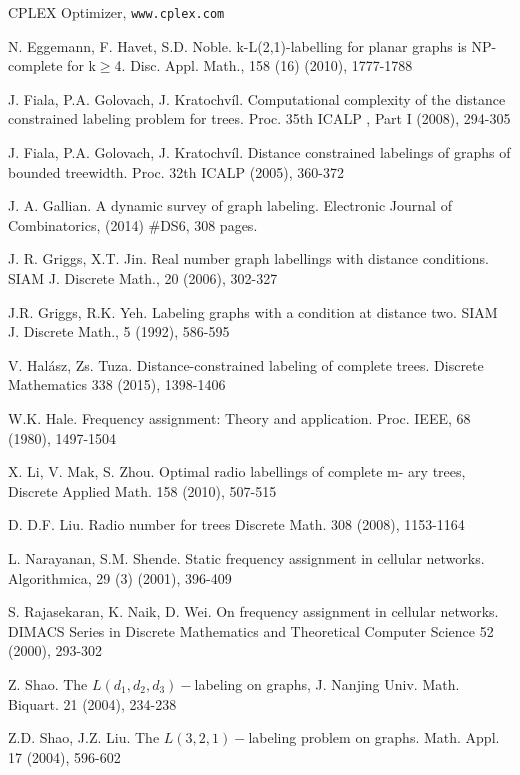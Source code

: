 \documentclass[smallextended]{svjour3}
\begin{document}
\begin{thebibliography}{1}
CPLEX Optimizer, \texttt{www.cplex.com}

N. Eggemann, F. Havet, S.D. Noble. k-L(2,1)-labelling 
for planar graphs is NP-complete for k$\geq$4. Disc. Appl. Math., 
158 (16) (2010), 1777-1788  

 J. Fiala, P.A. Golovach, J. Kratochv\'i­l. Computational 
complexity of the distance constrained labeling problem for trees. 
Proc. 35th ICALP , Part I (2008), 294-305 

J. Fiala, P.A. Golovach, J. Kratochv\'i­l. Distance 
constrained labelings of graphs of bounded treewidth. Proc. 32th ICALP (2005), 
360-372  

J. A. Gallian. A dynamic survey of graph labeling. Electronic Journal of Combinatorics, (2014) \#DS6, 308 pages. 

J. R. Griggs, X.T. Jin. Real number graph labellings with distance conditions. 
SIAM J. Discrete Math., 20 (2006), 302-327 

J.R. Griggs, R.K. Yeh. Labeling graphs with a condition 
at distance two. SIAM J. Discrete Math., 5 (1992), 586-595 

V. Hal\'asz, Zs. Tuza. Distance-constrained labeling of complete trees. Discrete Mathematics 338 (2015), 1398-1406

W.K. Hale. Frequency assignment: Theory and application. 
Proc. IEEE, 68 (1980), 1497-1504

X. Li, V. Mak, S. Zhou. Optimal radio labellings of complete m-
 ary trees, Discrete Applied Math. 158 (2010), 507-515

D. D.F. Liu. Radio number for trees Discrete Math. 308 (2008), 1153-1164

L. Narayanan, S.M. Shende. Static frequency assignment in cellular networks. Algorithmica, 29 (3) (2001), 396-409

S. Rajasekaran, K. Naik, D. Wei. On frequency assignment in cellular networks. DIMACS Series in Discrete Mathematics and Theoretical Computer Science 52 (2000), 293-302

Z. Shao. The $L(d_{1},d_{2},d_{3})-$labeling on 
graphs, J. Nanjing Univ. Math. Biquart. 21 (2004), 234-238 

Z.D. Shao, J.Z. Liu. The $L(3,2,1)-$labeling 
problem on graphs. Math. Appl. 17 (2004), 596-602 



\end{thebibliography} 
\end{document}
